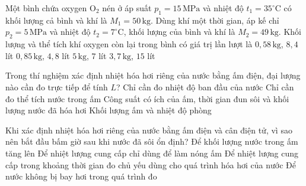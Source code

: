\begin{ex}
Một bình chứa oxygen $\mathrm{O_2}$ nén ở áp suất $p_1=15\,\mathrm{MPa}$ và nhiệt độ $t_1=35^\circ\mathrm{C}$ có khối lượng cả bình và khí là $M_1=50\,\mathrm{kg}$. Dùng khí một thời gian, áp kế chỉ $p_2=5\,\mathrm{MPa}$ và nhiệt độ $t_2=7^\circ\mathrm{C}$, khối lượng của bình và khí là $M_2=49\,\mathrm{kg}$. Khối lượng và thể tích khí oxygen còn lại trong bình có giá trị lần lượt là
\choice
{\True $0,58\,\mathrm{kg}$, $8,4$ lít}
{$0,85\,\mathrm{kg}$, $4,8$ lít}
{$5\,\mathrm{kg}$, $7$ lít}
{$3,7\,\mathrm{kg}$, $15$ lít}
\end{ex}

\begin{ex}
Trong thí nghiệm xác định nhiệt hóa hơi riêng của nước bằng ấm điện, đại lượng nào cần đo trực tiếp để tính $L$?
\choice
{Chỉ cần đo nhiệt độ ban đầu của nước}
{Chỉ cần đo thể tích nước trong ấm}
{\True Công suất có ích của ấm, thời gian đun sôi và khối lượng nước đã hóa hơi}
{Khối lượng ấm và nhiệt độ phòng}
\end{ex}

\begin{ex}
Khi xác định nhiệt hóa hơi riêng của nước bằng ấm điện và cân điện tử, vì sao nên bắt đầu bấm giờ sau khi nước đã sôi ổn định?
\choice
{Để khối lượng nước trong ấm tăng lên}
{Để nhiệt lượng cung cấp chỉ dùng để làm nóng ấm}
{\True Để nhiệt lượng cung cấp trong khoảng thời gian đo chủ yếu dùng cho quá trình hóa hơi của nước}
{Để nước không bị bay hơi trong quá trình đo}
\end{ex}

